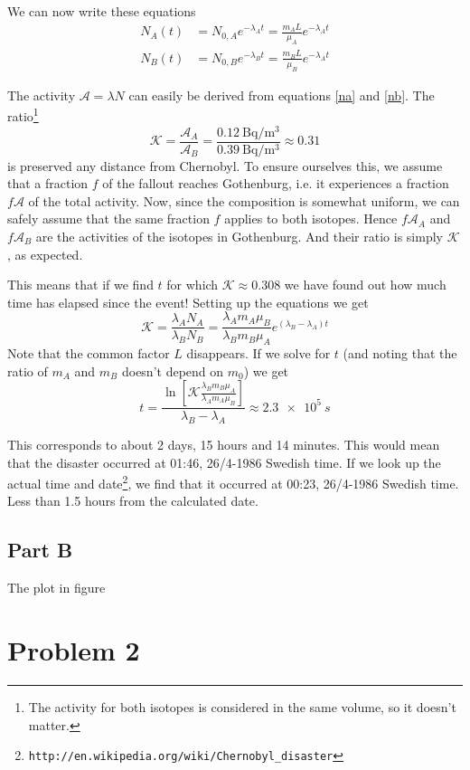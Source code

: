 \documentclass[a4paper, parskip=half, twopage]{scrartcl}
\begin{document}
We can now write these equations
\begin{align}
N_A(t) &= N_{0,A} e^{-\lambda_A t} = \frac{m_A L}{\mu_A} e^{-\lambda_A t} \label{na} \\
N_B(t) &= N_{0,B} e^{-\lambda_B t} = \frac{m_B L}{\mu_B} e^{-\lambda_A t} \label{nb}
\end{align}

The activity $\mathcal{A} = \lambda N$ can easily be derived from equations \ref{na} and \ref{nb}. The ratio\footnote{The activity for both isotopes is considered in the same volume, so it doesn't matter.}
\[
\mathcal{K} = \frac{\mathcal{A}_A}{\mathcal{A}_B} = \frac{\SI{0.12}{\becquerel\per\cubic\metre}}{\SI{0.39}{\becquerel\per\cubic\metre}} \approx 0.31
\]
is preserved any distance from Chernobyl. To ensure ourselves this, we assume that a fraction $f$ of the fallout reaches Gothenburg, i.e. it experiences a fraction $f\mathcal{A}$ of the total activity. Now, since the composition is somewhat uniform, we can safely assume that the same fraction $f$ applies to both isotopes. Hence $f\mathcal{A}_A$ and $f\mathcal{A}_B$ are the activities of the isotopes in Gothenburg. And their ratio is simply $\mathcal{K}$, as expected.

This means that if we find $t$ for which $\mathcal{K} \approx 0.308$ we have found out how much time has elapsed since the event! Setting up the equations we get
\[
\mathcal{K} = \frac{\lambda_A N_A}{\lambda_B N_B} = \frac{\lambda_A m_A \mu_B}{\lambda_B m_B \mu_A} e^{(\lambda_B - \lambda_A) t}
\]
Note that the common factor $L$ disappears. If we solve for $t$ (and noting that the ratio of $m_A$ and $m_B$ doesn't depend on $m_0$) we get
\[
t = \frac{\ln \left[ \mathcal{K} \frac{\lambda_B m_B \mu_A}{\lambda_A m_A \mu_B} \right]}{\lambda_B - \lambda_A} \approx \SI{2.3e5}{s}
\]

This corresponds to about 2 days, 15 hours and 14 minutes. This would mean that the disaster occurred at 01:46, 26/4-1986 Swedish time. If we look up the actual time and date\footnote{\texttt{http://en.wikipedia.org/wiki/Chernobyl\_disaster}}, we find that it occurred at 00:23, 26/4-1986 Swedish time. Less than 1.5 hours from the calculated date.

\subsection*{Part B}

The plot in figure 

\section*{Problem 2}
\end{document}
